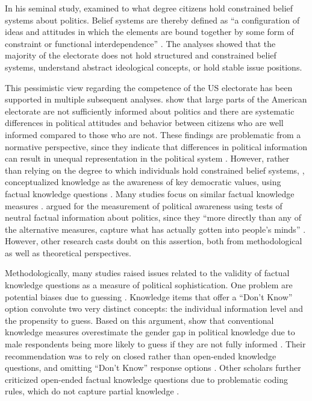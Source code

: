 \documentclass[12pt]{article}
\begin{document}
In his seminal study, \citet{converse1964nature} examined to what degree citizens hold constrained belief systems about politics. Belief systems are thereby defined as ``a configuration of ideas and attitudes in which the elements are bound together by some form of constraint or functional interdependence'' \citep[207]{converse1964nature}. The analyses showed that the majority of the electorate does not hold structured and constrained belief systems, understand abstract ideological concepts, or hold stable issue positions. 

This pessimistic view regarding the competence of the US electorate has been supported in multiple subsequent analyses. \citet{carpini1996americans} show that large parts of the American electorate are not sufficiently informed about politics and there are systematic differences in political attitudes and behavior between citizens who are well informed compared to those who are not. These findings are problematic from a normative perspective, since they indicate that differences in political information can result in unequal representation in the political system \citep[see also][]{althaus1998information,kuklinski2000misinformation,gilens2001political}. However, rather than relying on the degree to which individuals hold constrained belief systems, \citet{carpini1996americans}, conceptualized knowledge as the awareness of key democratic values, using factual knowledge questions \citep[see also][]{carpini1993measuring}. Many studies focus on similar factual knowledge measures \citep[e.g.][]{zaller1991information,jacoby1995structure,gomez2001political}.  \citet{zaller1992nature} argued for the measurement of political awareness using tests of neutral factual information about politics, since they ``more directly than any of the alternative measures, capture what has actually gotten into people’s minds'' \citep[21]{zaller1992nature}. However, other research casts doubt on this assertion, both from methodological as well as theoretical perspectives.

Methodologically, many studies raised issues related to the validity of factual knowledge questions as a measure of political sophistication. One problem  are potential biases due to guessing \citep{mondak2000reconsidering,mondak2001developing,mondak2001asked,miller2008experimenting}. Knowledge items that offer a ``Don't Know'' option convolute two very distinct concepts: the individual information level and the propensity to guess. Based on this argument, \citet{mondak2004knowledge} show that conventional knowledge measures overestimate the gender gap in political knowledge due to male respondents being more likely to guess if they are not fully informed \citep[see also][]{pietryka2013analysis}. Their recommendation was to rely on closed rather than open-ended knowledge questions, and omitting ``Don't Know'' response options \citep[but see][]{sturgis2008experiment,luskin2011don}. Other scholars further criticized open-ended factual knowledge questions due to problematic coding rules, which do not capture partial knowledge \citep{krosnick2008problems,gibson2009knowing,debell2013harder}.
\end{document}
